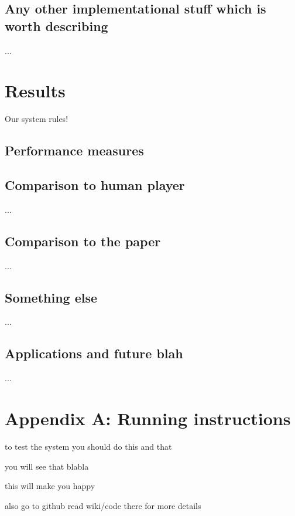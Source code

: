 \documentclass[a4paper,12pt]{article}
\begin{document}
\subsection{Any other implementational stuff which is worth describing}
...


%
%
\pagebreak
\section{Results}
Our system rules!

\subsection{Performance measures}

\subsection{Comparison to human player}
...

\subsection{Comparison to the paper}
...

\subsection{Something else}
...

\subsection{Applications and future blah}
...



%
%
\pagebreak
\section*{Appendix A: Running instructions}
to test the system you should do this and that

you will see that blabla

this will make you happy

also go to github read wiki/code there for more details



%
%
\pagebreak
{}


\end{document}
